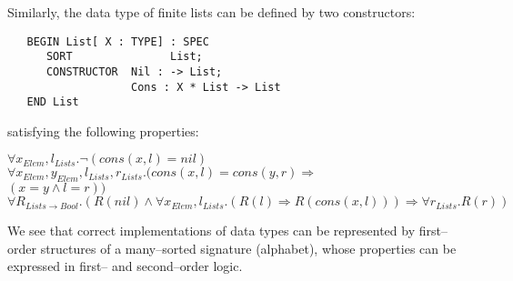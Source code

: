 \documentclass[landscape, autoslides, light]{mmiss}
\newcommand{\ns}{\normalsize}
\begin{document}
\begin{Package}[Label={FSDPT}, Title={Formal Specification of Data and Process Types}, ShortTitle={FSDPT}, Authors={Horst Reichel}, Date={February 2003}, LevelOfDetail=Lecture, Language=en-GB]
\begin{Section}[Title={Introduction}, Label={section2}]
\begin{Paragraph}[Title={Basic Intuition}, Label=Paragraph9]

\end{Paragraph}
\begin{Paragraph}[Title={Basic Intuition}, Label=Paragraph10]

Similarly, the data type of finite lists can be defined by two
constructors: \vspace{8mm} \small
\begin{verbatim}
   BEGIN List[ X : TYPE] : SPEC
      SORT               List;
      CONSTRUCTOR  Nil : -> List;
                   Cons : X * List -> List
   END List
\end{verbatim}
\ns



\end{Paragraph}
\begin{Paragraph}[Title={Basic Intuition}, Label=Paragraph11]

satisfying the following properties:\vspace{8mm}
\begin{List}[ListType=enumerate]
    \ListItem  $\forall x_{Elem}, l_{Lists}. \neg( cons(x,l) = nil) $ \pause
    \ListItem  $\forall x_{Elem}, y_{Elem}, l_{Lists}, r_{Lists}.
   (cons(x,l) = cons(y,r) \Rightarrow $ \\
      $(x = y \wedge l = r)) $ \pause
    \ListItem $\forall R_{Lists \to Bool}.(R(nil) \wedge \forall x_{Elem}, l_{Lists}.
   (R(l) \Rightarrow R(cons(x,l))) \Rightarrow \forall r_{Lists} .
   R(r))$
\end{List}


\end{Paragraph}
\begin{Paragraph}[Title={Basic Intuition}, Label=Paragraph12]

We see that correct implementations of data types can be
represented by first--order structures of a many--sorted signature
(alphabet), whose properties can be expressed in first-- and
second--order logic.


\end{Paragraph}
\begin{Paragraph}[Title={Basic Intuition - Initiality}, Label=Paragraph13]


\end{Paragraph}
\end{Section}
\end{Package}
\end{document}
